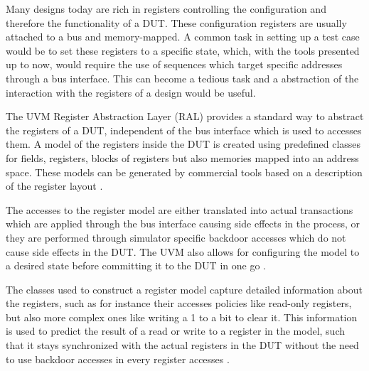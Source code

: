 Many designs today are rich in registers controlling the configuration and therefore the functionality of a DUT.
These configuration registers are usually attached to a bus and memory-mapped. A common task in setting up a test
case would be to set these registers to a specific state, which, with the tools presented up to now, would require
the use of sequences which target specific addresses through a bus interface. This can become a tedious task and a
abstraction of the interaction with the registers of a design would be useful.

The UVM Register Abstraction Layer (RAL) provides a standard way to abstract the registers of a DUT, independent of
the bus interface which is used to accesses them. A model of the registers inside the DUT is created using predefined
classes for fields, registers, blocks of registers but also memories mapped into an address space. These models can
be generated by commercial tools based on a description of the register layout \cite{uvm_ral}.

The accesses to the register model are either translated into actual transactions which are applied through the bus
interface causing side effects in the process, or they are performed through simulator specific backdoor accesses
which do not cause side effects in the DUT. The UVM also allows for configuring the model to a desired state before
committing it to the DUT in one go \cite{uvm_ral}.

The classes used to construct a register model capture detailed information about the registers, such as for instance
their accesses policies like read-only registers, but also more complex ones like writing a 1 to a bit to clear it.
This information is used to predict the result of a read or write to a register in the model, such that it stays
synchronized with the actual registers in the DUT without the need to use backdoor accesses in every register
accesses \cite{uvm_ral}.

